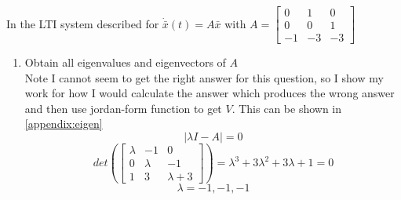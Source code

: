 \item In the LTI system described for $\dot {\bar x}(t) = A\bar x$ with
  $A = \begin{bmatrix}
0 & 1 & 0\\
0 & 0 & 1\\
-1 & -3 & -3
\end{bmatrix}
$
  \begin{enumerate}
  \item Obtain all eigenvalues and eigenvectors of $A$\label{1-a}\\
    Note I cannot seem to get the right answer for this question, so I show my work for how I would calculate the
    answer which produces the wrong answer and then use jordan-form function to get $V$. This can be shown in
    \ref{appendix:eigen}
    \begin{equation}
  \vert \lambda I - A \vert = 0
\end{equation}
\begin{equation}
  det(\left[\begin{matrix}\lambda & -1 & 0\\0 & \lambda & -1\\1 & 3 & \lambda + 3\end{matrix}\right]) = \lambda^{3} + 3 \lambda^{2} + 3 \lambda + 1 = 0
\end{equation}
\begin{equation}
  \lambda = -1, -1, -1
\end{equation}


\end{enumerate}
